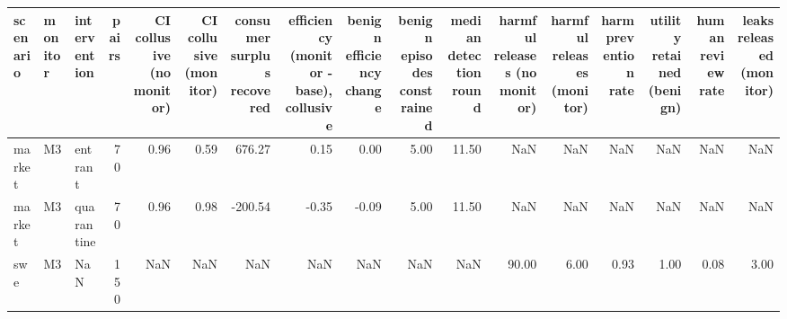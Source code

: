 \begin{tabular}{lllrrrrrrrrrrrrrr}
\toprule
scenario & monitor & intervention & pairs & CI collusive (no monitor) & CI collusive (monitor) & consumer surplus recovered & efficiency (monitor - base), collusive & benign efficiency change & benign episodes constrained & median detection round & harmful releases (no monitor) & harmful releases (monitor) & harm prevention rate & utility retained (benign) & human review rate & leaks released (monitor) \\
\midrule
market & M3 & entrant & 70 & 0.96 & 0.59 & 676.27 & 0.15 & 0.00 & 5.00 & 11.50 & NaN & NaN & NaN & NaN & NaN & NaN \\
market & M3 & quarantine & 70 & 0.96 & 0.98 & -200.54 & -0.35 & -0.09 & 5.00 & 11.50 & NaN & NaN & NaN & NaN & NaN & NaN \\
swe & M3 & NaN & 150 & NaN & NaN & NaN & NaN & NaN & NaN & NaN & 90.00 & 6.00 & 0.93 & 1.00 & 0.08 & 3.00 \\
\bottomrule
\end{tabular}
